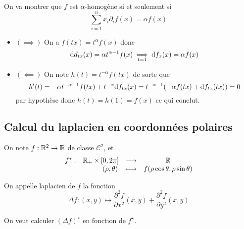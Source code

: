 On va montrer que $f$ est $\alpha$-homogène si et seulement si \[
    \sum_{i=1}^nx_i\partial_if(x)=\alpha f(x)
\]

\begin{itemize}
    \item $(\implies)$ On a $f(tx)=t^\alpha f(x)$ donc \[
            \mathrm{d} d_{tx}(x)=\alpha t^{\alpha-1}f(x)\underset{t=1}\implies \mathrm{d} f_x(x)=\alpha f(x)
        \]
    \item $(\impliedby)$ On note $h(t)=t^{-\alpha}f(tx)$ de sorte que \[
            h'(t)=-\alpha t^{-\alpha-1}f(tx)+t^{-\alpha}\mathrm{d} f_{tx}(x)=t^{-\alpha-1}(-\alpha f(tx)+\mathrm{d} f_{tx}(tx))=0
        \] par hypothèse donc $h(t)=h(1)=f(x)$ ce qui conclut.
\end{itemize}

\subsection{Calcul du laplacien en coordonnées polaires}

On note $f:\mathbb R^2\to \mathbb R $ de classe $\mathcal C^2$, et \[
    \begin{matrix}
        f^\star :&\R_+\times [0, 2\pi]&\longrightarrow & \R \\
                 &\phantom{\R_+\times \;\;}(\rho, \theta) &\longmapsto &f(\rho\cos\theta, \rho\sin\theta)
    \end{matrix}
\]

On appelle laplacien de $f$ la fonction \[
    \Delta f: (x, y)\longmapsto \frac{\partial^2f}{\partial x^2}(x, y)+ \frac{\partial^2 f}{\partial y^2}(x, y)  
\]

On veut calculer $(\Delta f)^\star$ en fonction de $f^\star$.

